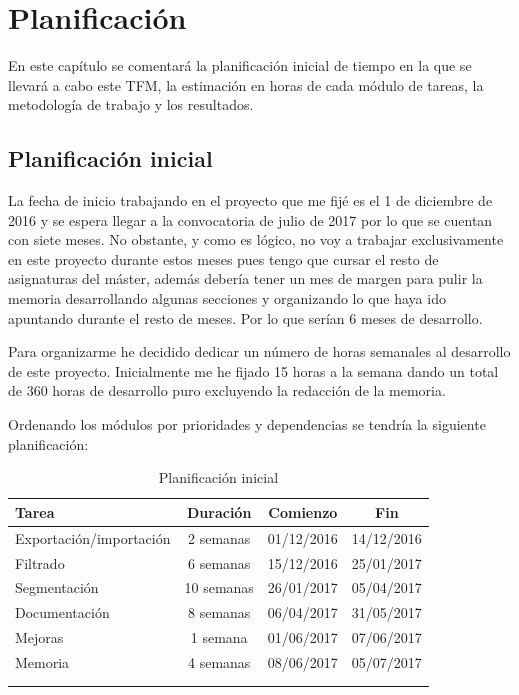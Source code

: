 \chapter{Planificación}

En este capítulo se comentará la planificación inicial de tiempo en la que se llevará a cabo este TFM, la estimación en horas de cada módulo de tareas, la metodología de trabajo y los resultados.

\section{Planificación inicial}

La fecha de inicio trabajando en el proyecto que me fijé es el 1 de diciembre de 2016 y se espera llegar a la convocatoria de julio de 2017 por lo que se cuentan con siete meses. No obstante, y como es lógico, no voy a trabajar exclusivamente en este proyecto durante estos meses pues tengo que cursar el resto de asignaturas del máster, además debería tener un mes de margen para pulir la memoria desarrollando algunas secciones y organizando lo que haya ido apuntando durante el resto de meses. Por lo que serían 6 meses de desarrollo.

Para organizarme he decidido dedicar un número de horas semanales al desarrollo de este proyecto. Inicialmente me he fijado 15 horas a la semana dando un total de 360 horas de desarrollo puro excluyendo la redacción de la memoria.

Ordenando los módulos por prioridades y dependencias se tendría la siguiente planificación:

\begin{longtable} {l c c c}
	\hline
	\textbf{Tarea}			&	\textbf{Duración}	&	\textbf{Comienzo}	&	\textbf{Fin}	\\
	\hline \hline
	\endhead
	\hline 
	Exportación/importación	&	2 semanas			&	01/12/2016			&	14/12/2016		\\
	\hline
	Filtrado				&	6 semanas			&	15/12/2016			&	25/01/2017		\\
	\hline
	Segmentación			&	10 semanas			&	26/01/2017			&	05/04/2017		\\
	\hline
	Documentación			&	8 semanas			&	06/04/2017			&	31/05/2017		\\
	\hline
	Mejoras					&	1 semana			&	01/06/2017			&	07/06/2017		\\
	\hline
	Memoria					&	4 semanas			&	08/06/2017			&	05/07/2017		\\
	\hline
	\\
	\caption{Planificación inicial}
	\label{tab:planificacion/planificacion-inicial}
\end{longtable}

